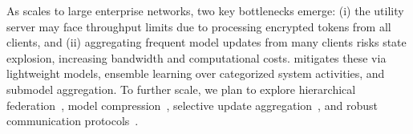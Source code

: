 As \Sys scales to large enterprise networks, two key bottlenecks emerge: (i) the utility server may face throughput limits due to processing encrypted tokens from all clients, and (ii) aggregating frequent model updates from many clients risks state explosion, increasing bandwidth and computational costs. \Sys mitigates these via lightweight models, ensemble learning over categorized system activities, and submodel aggregation. To further scale, we plan to explore hierarchical federation~\cite{zhong2022flee}, model compression~\cite{choudhary2020comprehensive}, selective update aggregation~\cite{ye2020federated}, and robust communication protocols~\cite{laclau2020robust}.






